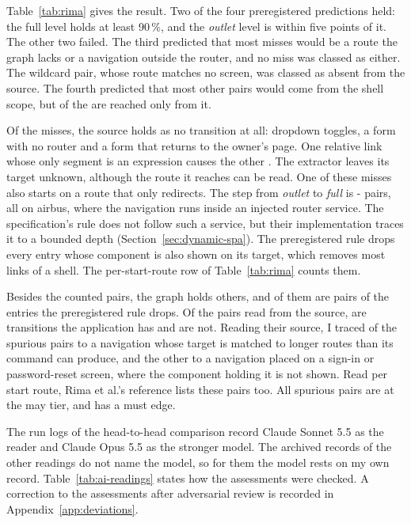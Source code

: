Table~\ref{tab:rima} gives the result. Two of the four preregistered
predictions held: the full level holds at least 90\,\%, and the \emph{outlet} level is within five
points of it. The other two failed. The third predicted that most misses would be a route the graph
lacks or a navigation outside the router, and no miss was classed as either. The wildcard pair,
whose route matches no screen, was classed as absent from the source. The fourth predicted that
most other pairs would come from the shell scope, but \RimaExtraTop{} of the \RimaExtra{} are
reached only from it.

Of the \RimaMissed{} misses, the source holds \RimaMissE{} as no transition at all: dropdown
toggles, a form with no router and a form that returns to the owner's page. One relative link
whose only segment is an expression causes the other \RimaMissF{}. The extractor leaves
its target unknown, although the route it reaches can be read. One of these misses also starts on a
route that only redirects. The step from \emph{outlet} to \emph{full} is
\the\numexpr\RimaHitFull-\RimaHitOutlet\relax{} pairs, all on airbus, where the navigation runs
inside an injected router service. The specification's rule does not follow such a service, but
their implementation traces it to a bounded depth (Section~\ref{sec:dynamic-spa}). The
preregistered rule drops every entry whose component is also shown on its target, which removes
most links of a shell. The per-start-route row of Table~\ref{tab:rima} counts them.

Besides the counted pairs, the graph holds \RimaExtra{} others, and \RimaExtraInPs{} of them are
pairs of the entries the preregistered rule drops. Of the \RimaJudged{} pairs read from the source,
\RimaJudgedReal{} are transitions the application has and \RimaJudgedSpurious{} are not. Reading
their source, I traced \RimaSpuriousTarget{} of the spurious pairs to a navigation whose target is
matched to longer routes than its command can produce, and the other \RimaSpuriousAttribution{} to a
navigation placed on a sign-in or password-reset screen, where the component holding it is not
shown. Read per start route, Rima et al.'s reference lists these
\RimaSpuriousAttribution{} pairs too. All
\RimaJudgedSpurious{} spurious pairs are at the may tier, and \RimaSpuriousMust{} has a must edge.

The run logs of the head-to-head comparison record Claude Sonnet 5.5 as the reader and Claude Opus 5.5
as the stronger model. The archived records of the other readings do not name the model, so for
them the model rests on my own record. Table~\ref{tab:ai-readings} states how the
assessments were checked. A correction to the assessments after adversarial review is recorded in
Appendix~\ref{app:deviations}.

